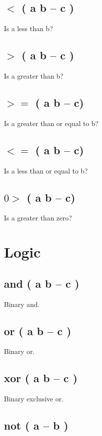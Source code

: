 \subsection{$<$ ( a b -- c )}

Is a less than b?

\subsection{$>$ ( a b -- c )}

Is a greater than b?

\subsection{$>=$ ( a b -- c)}

Is a greater than or equal to b?

\subsection{$<=$ ( a b -- c)}

Is a less than or equal to b?

\subsection{$0>$ ( a b -- c)}

Is a greater than zero?


\section{Logic}

\subsection{and ( a b -- c )}

Binary and.

\subsection{or ( a b -- c )}

Binary or.

\subsection{xor ( a b -- c )}

Binary exclusive or.

\subsection{not ( a -- b )}

